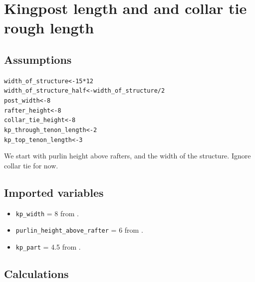 \documentclass{article}\usepackage[]{graphicx}\usepackage[]{xcolor}
\makeatletter
\newcommand{\hlnum}[1]{\textcolor[rgb]{0.686,0.059,0.569}{#1}}%
\newcommand{\hlopt}[1]{\textcolor[rgb]{0,0,0}{#1}}%
\newcommand{\hlstd}[1]{\textcolor[rgb]{0.345,0.345,0.345}{#1}}%
\newcommand{\hlkwb}[1]{\textcolor[rgb]{0.69,0.353,0.396}{#1}}%
\newenvironment{kframe}{%
 \def\at@end@of@kframe{}%
 \ifinner\ifhmode%
  \def\at@end@of@kframe{\end{minipage}}%
  \begin{minipage}{\columnwidth}%
 \fi\fi%
 \def\FrameCommand##1{\hskip\@totalleftmargin \hskip-\fboxsep
 \colorbox{shadecolor}{##1}\hskip-\fboxsep
     \hskip-\linewidth \hskip-\@totalleftmargin \hskip\columnwidth}%
 \MakeFramed {\advance\hsize-\width
   \@totalleftmargin\z@ \linewidth\hsize
   \@setminipage}}%
 {\par\unskip\endMakeFramed%
 \at@end@of@kframe}
\newenvironment{knitrout}{}{} %
\makeatother
\begin{document}
\section{Kingpost length and and collar tie rough length}\label{kp-and-collar-tie-lengths}

\subsection{Assumptions} \label{kp-collar-tie-assumptions}


\begin{knitrout}
\color{fgcolor}\begin{kframe}
\begin{alltt}
\hlstd{width_of_structure} \hlkwb{<-} \hlnum{15}\hlopt{*}\hlnum{12}
\hlstd{width_of_structure_half} \hlkwb{<-} \hlstd{width_of_structure}\hlopt{/}\hlnum{2}
\hlstd{post_width} \hlkwb{<-} \hlnum{8}
\hlstd{rafter_height} \hlkwb{<-} \hlnum{8}
\hlstd{collar_tie_height} \hlkwb{<-} \hlnum{8}
\hlstd{kp_through_tenon_length} \hlkwb{<-} \hlnum{2}
\hlstd{kp_top_tenon_length} \hlkwb{<-} \hlnum{3}
\end{alltt}
\end{kframe}
\end{knitrout}
We start with purlin height above rafters, and the width of the structure. Ignore collar tie for now.

\subsection{Imported variables} \label{kp-collar-tie-imported-variables}

\begin{itemize}
  \item \verb+kp_width+ = 8 from .
  \item \verb+purlin_height_above_rafter+ = 6 from .
  \item \verb+kp_part+ = 4.5 from .
\end{itemize}

\subsection{Calculations} \label{kp-collar-tie-calculations}
\end{document}
